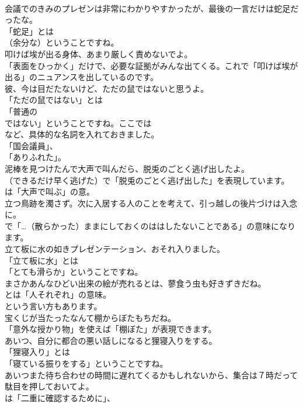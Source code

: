 \documentclass[8pt]{extreport}
\begin{document}
\begin{CJK}{UTF8}{min}
\\	会議でのきみのプレゼンは非常にわかりやすかったが、最後の一言だけは蛇足だったな。 
\\	「蛇足」とは
\\	（余分な）ということですね。	
\\	叩けば埃が出る身体、あまり厳しく責めないでよ。 
\\	「表面をひっかく」だけで、必要な証拠がみんな出てくる。これで「叩けば埃が出る」のニュアンスを出しているのです。	
\\	彼、今は目だたないけど、ただの鼠ではないと思うよ。 
\\	「ただの鼠ではない」とは
\\	「普通の 
\\	ではない」ということですね。ここでは
\\	など、具体的な名詞を入れておきました。
\\	「国会議員」、
\\	「ありふれた」。	
\\	泥棒を見つけたんで大声で叫んだら、脱兎のごとく逃げ出したよ。 
\\	（できるだけ早く逃げた）で「脱兎のごとく逃げ出した」を表現しています。
\\	は「大声で叫ぶ」の意。	
\\	立つ鳥跡を濁さず。次に入居する人のことを考えて、引っ越しの後片づけは入念に。 
\\	で「…（散らかった）ままにしておくのははしたないことである」の意味になります。	
\\	立て板に水の如きプレゼンテーション、おそれ入りました。 
\\	「立て板に水」とは
\\	「とても滑らか」ということですね。	
\\	まさかあんなひどい出来の絵が売れるとは、蓼食う虫も好きずきだね。 
\\	とは「人それぞれ」の意味。
\\	という言い方もあります。	
\\	宝くじが当たったなんて棚からぼたもちだね。 
\\	「意外な授かり物」を使えば「棚ぼた」が表現できます。	
\\	あいつ、自分に都合の悪い話しになると狸寝入りをする。 
\\	「狸寝入り」とは
\\	「寝ている振りをする」ということですね。	
\\	あいつまた待ち合わせの時間に遅れてくるかもしれないから、集合は７時だって駄目を押しておいてよ。 
\\	は「二重に確認するために」、

\end{CJK}
\end{document}
